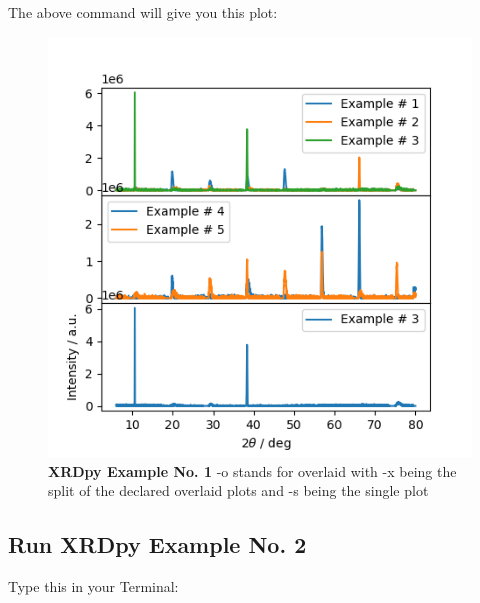 \documentclass{article}
\begin{document}
\begin{description}
The above command will give you this plot:

\begin{figure}[htbp]
\centerline{\includegraphics[scale=.70]{fake-XRDpy.png}}
\caption {\textbf{XRDpy Example No. 1} -o stands for overlaid with -x being the split of the declared overlaid plots and -s being the single plot}
\label{fig6}
\end{figure}


\end{description}

\pagebreak 

\subsection{Run XRDpy Example No. 2}

Type this in your Terminal:
\end{document}
